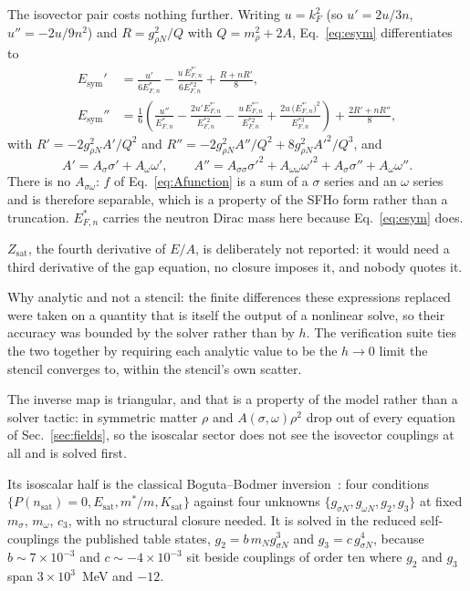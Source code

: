 \documentclass[aps,prc,onecolumn,superscriptaddress,nofootinbib,10pt]{revtex4-2}
\newcommand{\nsat}{n_{\mathrm{sat}}}
\begin{document}
The isovector pair costs nothing further. Writing $u = k_F^2$ (so
$u' = 2u/3n$, $u'' = -2u/9n^2$) and $R = g_{\rho N}^2/Q$ with
$Q = m_\rho^2 + 2A$, Eq.~\eqref{eq:esym} differentiates to
%
\begin{align}
E_{\mathrm{sym}}' &= \frac{u'}{6 E^*_{F,n}}
   - \frac{u\, E^{*\prime}_{F,n}}{6 E^{*2}_{F,n}}
   + \frac{R + n R'}{8} , \\
E_{\mathrm{sym}}'' &= \frac16 \left(
     \frac{u''}{E^*_{F,n}}
   - \frac{2 u' E^{*\prime}_{F,n}}{E^{*2}_{F,n}}
   - \frac{u\, E^{*\prime\prime}_{F,n}}{E^{*2}_{F,n}}
   + \frac{2 u\, \big(E^{*\prime}_{F,n}\big)^2}{E^{*3}_{F,n}} \right)
   + \frac{2 R' + n R''}{8} ,
\end{align}
%
with
$R' = -2 g_{\rho N}^2 A' / Q^2$ and
$R'' = -2 g_{\rho N}^2 A''/Q^2 + 8 g_{\rho N}^2 A'^2 / Q^3$, and
%
\begin{equation}
A' = A_\sigma \sigma' + A_\omega \omega' ,
\qquad
A'' = A_{\sigma\sigma}\sigma'^2 + A_{\omega\omega}\omega'^2
    + A_\sigma \sigma'' + A_\omega \omega'' .
\end{equation}
%
There is no $A_{\sigma\omega}$: $f$ of Eq.~\eqref{eq:Afunction} is a sum of a
$\sigma$ series and an $\omega$ series and is therefore separable, which is a
property of the SFHo form rather than a truncation. $E^*_{F,n}$ carries the
neutron Dirac mass here because Eq.~\eqref{eq:esym} does.

$Z_{\mathrm{sat}}$, the fourth derivative of $E/A$, is deliberately not
reported: it would need a third derivative of the gap equation, no closure
imposes it, and nobody quotes it.

Why analytic and not a stencil: the finite differences these expressions
replaced were taken on a quantity that is itself the output of a nonlinear
solve, so their accuracy was bounded by the solver rather than by $h$. The
verification suite ties the two together by requiring each analytic value to
be the $h \to 0$ limit the stencil converges to, within the stencil's own
scatter.

The inverse map is triangular, and that is a property of the model rather than
a solver tactic: in symmetric matter $\rho$ and $A(\sigma,\omega)\rho^2$ drop
out of every equation of Sec.~\ref{sec:fields}, so the isoscalar sector does
not see the isovector couplings at all and is solved first.

Its isoscalar half is the classical Boguta--Bodmer
inversion~\cite{BogutaBodmer1977}: four conditions $\{P(\nsat) = 0,
E_{\mathrm{sat}}, m^*/m, K_{\mathrm{sat}}\}$ against four unknowns
$\{g_{\sigma N}, g_{\omega N}, g_2, g_3\}$ at fixed $m_\sigma$, $m_\omega$,
$c_3$, with no structural closure needed. It is solved in the reduced
self-couplings the published table states, $g_2 = b\, m_N g_{\sigma N}^3$ and
$g_3 = c\, g_{\sigma N}^4$, because $b \sim 7\times10^{-3}$ and
$c \sim -4\times10^{-3}$ sit beside couplings of order ten where $g_2$ and
$g_3$ span $3\times10^3$~MeV and $-12$.
\end{document}
